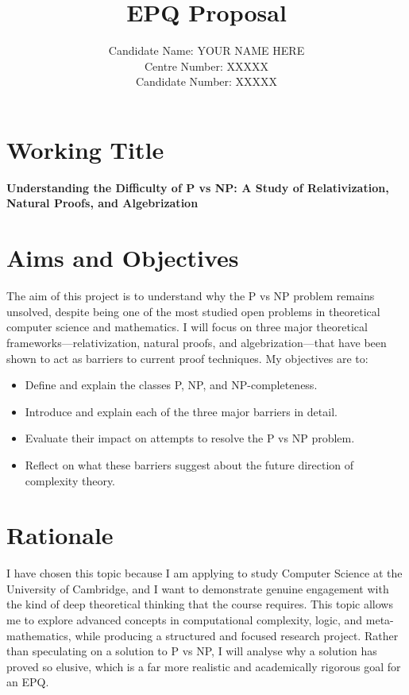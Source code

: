 \documentclass[12pt]{article}
\title{EPQ Proposal}
\author{Candidate Name: YOUR NAME HERE\\Centre Number: XXXXX\\Candidate Number: XXXXX}
\date{}
\begin{document}
\maketitle

\section*{Working Title}
\textbf{Understanding the Difficulty of P vs NP: A Study of Relativization, Natural Proofs, and Algebrization}

\section*{Aims and Objectives}
The aim of this project is to understand why the P vs NP problem remains unsolved, despite being one of the most studied open problems in theoretical computer science and mathematics. I will focus on three major theoretical frameworks—relativization, natural proofs, and algebrization—that have been shown to act as barriers to current proof techniques. My objectives are to:
\begin{itemize}
    \item Define and explain the classes P, NP, and NP-completeness.
    \item Introduce and explain each of the three major barriers in detail.
    \item Evaluate their impact on attempts to resolve the P vs NP problem.
    \item Reflect on what these barriers suggest about the future direction of complexity theory.
\end{itemize}

\section*{Rationale}
I have chosen this topic because I am applying to study Computer Science at the University of Cambridge, and I want to demonstrate genuine engagement with the kind of deep theoretical thinking that the course requires. This topic allows me to explore advanced concepts in computational complexity, logic, and meta-mathematics, while producing a structured and focused research project. Rather than speculating on a solution to P vs NP, I will analyse why a solution has proved so elusive, which is a far more realistic and academically rigorous goal for an EPQ.
\end{document}
